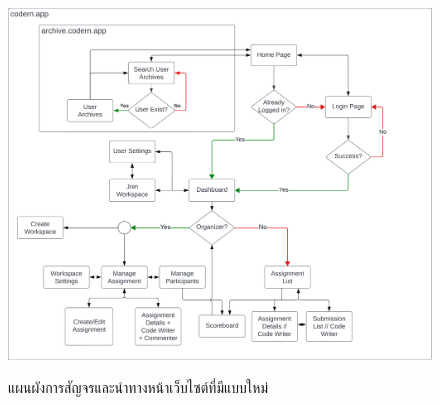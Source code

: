 \documentclass[12pt,one side,openright,a4paper]{cpe-thesis-th}
\begin{document}


\makeatletter
\g@addto@macro{\UrlBreaks}{\UrlOrds}
\makeatother







    \begin{figure}[H]
        \centering
            \includegraphics[width=15cm]{figure/diagram/navigation-v3.png}
        \label{fig:appendix-nav-map}
        \caption[แผนผังการสัญจรและนำทางหน้าเว็บไซต์ที่มีแบบใหม่]{แผนผังการสัญจรและนำทางหน้าเว็บไซต์ที่มีแบบใหม่}
    \end{figure}
    
\end{document}
